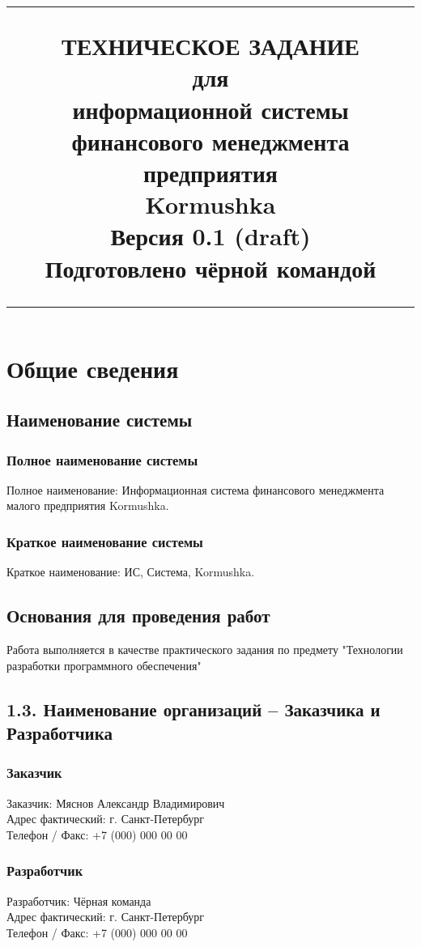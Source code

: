 \documentclass[a4paper, 12pt]{article}		%
\title{%
\flushright
\rule{16cm}{5pt}\vskip1cm
\Huge{ТЕХНИЧЕСКОЕ ЗАДАНИЕ}\\ %
\vspace{2cm}
для\\
\vspace{2cm}
информационной системы\\финансового менеджмента предприятия\\
\vspace{2cm}
\LARGE{Kormushka\\}
\vspace{2cm}
\LARGE{Версия 0.1 (draft)\\}
\vspace{2cm}
Подготовлено чёрной командой\\
\vfill
\rule{16cm}{5pt}
}
\date{}
\begin{document}
\maketitle


\tableofcontents{}

\newpage
\section{Общие сведения}
\subsection{Наименование системы}
\subsubsection{Полное наименование системы}
Полное наименование: Информационная система финансового менеджмента малого предприятия Kormushka.

\subsubsection{Краткое наименование системы}
Краткое наименование: ИС, Система, Kormushka.

\subsection{Основания для проведения работ}
Работа выполняется в качестве практического задания по предмету "Технологии разработки программного обеспечения"

\subsection{1.3. Наименование организаций – Заказчика и Разработчика}

\subsubsection{Заказчик}
Заказчик: Мяснов Александр Владимирович\\
Адрес фактический: г. Санкт-Петербург\\
Телефон / Факс: +7 (000) 000 00 00

\subsubsection{Разработчик}
Разработчик: Чёрная команда\\
Адрес фактический: г. Санкт-Петербург\\
Телефон / Факс: +7 (000) 000 00 00
\end{document}
